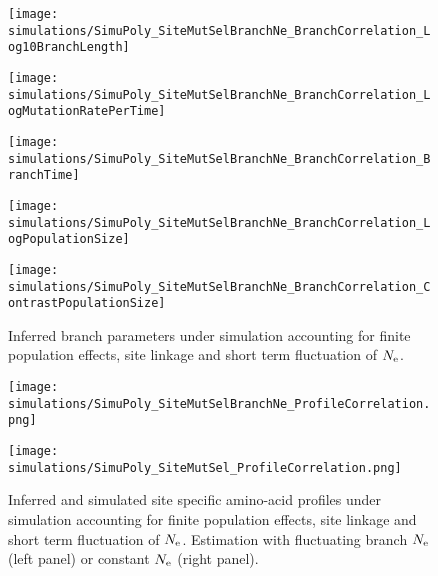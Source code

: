 \begin{figure}[H]
    \centering
    \begin{minipage}{0.32\linewidth}
        \texttt{[image: simulations/SimuPoly\_SiteMutSelBranchNe\_BranchCorrelation\_Log10BranchLength]}
    \end{minipage}    \hfill
    \begin{minipage}{0.32\linewidth}
        \texttt{[image: simulations/SimuPoly\_SiteMutSelBranchNe\_BranchCorrelation\_LogMutationRatePerTime]}
    \end{minipage}    \hfill
    \begin{minipage}{0.32\linewidth}
        \texttt{[image: simulations/SimuPoly\_SiteMutSelBranchNe\_BranchCorrelation\_BranchTime]}
    \end{minipage}    \hfill
    \begin{minipage}{0.32\linewidth}
        \texttt{[image: simulations/SimuPoly\_SiteMutSelBranchNe\_BranchCorrelation\_LogPopulationSize]}
    \end{minipage}
    \begin{minipage}{0.32\linewidth}
        \texttt{[image: simulations/SimuPoly\_SiteMutSelBranchNe\_BranchCorrelation\_ContrastPopulationSize]}
    \end{minipage} \hfill
    \caption[Inferred branch parameters for SimuPoly]{
    Inferred branch parameters under simulation accounting for finite population effects, site linkage and short term fluctuation of $N_{\mathrm{e}}$.
    }
\end{figure}


\begin{figure}[H]
    \centering
    \begin{minipage}{0.49\linewidth}
        \texttt{[image: simulations/SimuPoly\_SiteMutSelBranchNe\_ProfileCorrelation.png]}
    \end{minipage}    \hfill
    \begin{minipage}{0.49\linewidth}
        \texttt{[image: simulations/SimuPoly\_SiteMutSel\_ProfileCorrelation.png]}
    \end{minipage}
    \caption[Inferred site amino-acid profiles for SimuPoly]{
    Inferred and simulated site specific amino-acid profiles under simulation accounting for finite population effects, site linkage and short term fluctuation of $N_{\mathrm{e}}$.
    Estimation with fluctuating branch $N_{\mathrm{e}}$ (left panel) or constant $N_{\mathrm{e}}$ (right panel).}
\end{figure}

